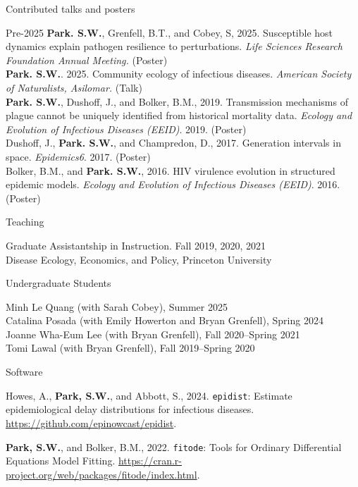 \documentclass[
	11pt, %
]{resume} %
\newenvironment{yeardesc}[1][3.2cm]{%
  \begin{list}{}{%
    \setlength{\labelwidth}{#1}%
    \setlength{\labelsep}{0.6em}
    \setlength{\leftmargin}{\labelwidth}%
    \addtolength{\leftmargin}{\labelsep}
    \setlength{\itemsep}{.25\baselineskip}
    \setlength{\topsep}{.25\baselineskip}
    \renewcommand\makelabel[1]{\bfseries ##1\hfil\newline}%
  }%
}{\end{list}}
\begin{document}
\begin{rSection}{Contributed talks and posters}

\begin{yeardesc}[2.2cm]
  \item[Pre-2025]
  \textbf{Park. S.W.}, Grenfell, B.T., and Cobey, S, 2025. Susceptible host dynamics explain pathogen resilience to perturbations. \textit{Life Sciences Research Foundation Annual Meeting.} (Poster)\\
  \textbf{Park. S.W.}. 2025. Community ecology of infectious diseases. \textit{American Society of Naturalists, Asilomar.} (Talk)\\
  \textbf{Park. S.W.}, Dushoff, J., and Bolker, B.M., 2019. Transmission mechanisms of plague cannot be uniquely identified from historical mortality data. \textit{Ecology and Evolution of Infectious Diseases (EEID)}. 2019. (Poster)\\
  Dushoff, J., \textbf{Park. S.W.}, and Champredon, D., 2017. Generation intervals in space. \textit{Epidemics6}. 2017. (Poster)\\
  Bolker, B.M., and \textbf{Park. S.W.}, 2016. HIV virulence evolution in structured epidemic models. \textit{Ecology and Evolution of Infectious Diseases (EEID)}. 2016. (Poster)\\
\end{yeardesc}

\end{rSection}


\begin{rSection}{Teaching}

Graduate Assistantship in Instruction. \hfill Fall 2019, 2020, 2021\\
Disease Ecology, Economics, and Policy, Princeton University

\end{rSection}

\begin{rSection}{Undergraduate Students}

Minh Le Quang (with Sarah Cobey), Summer 2025\\
Catalina Posada (with Emily Howerton and Bryan Grenfell), Spring 2024\\
Joanne Wha-Eum Lee (with Bryan Grenfell), Fall 2020--Spring 2021\\
Tomi Lawal (with Bryan Grenfell), Fall 2019--Spring 2020

\end{rSection}

\begin{rSection}{Software}

Howes, A., \textbf{Park, S.W.}, and Abbott, S., 2024. \texttt{epidist}: Estimate epidemiological delay distributions for infectious diseases. \url{https://github.com/epinowcast/epidist}.

\textbf{Park, S.W.}, and Bolker, B.M., 2022. \texttt{fitode}: Tools for Ordinary Differential Equations Model Fitting. \url{https://cran.r-project.org/web/packages/fitode/index.html}.

\end{rSection}
\end{document}

